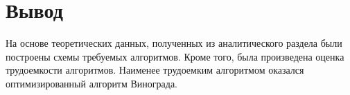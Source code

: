 \section*{Вывод}

На основе теоретических данных, полученных из аналитического раздела
были построены схемы требуемых алгоритмов. Кроме того, была произведена оценка трудоемкости алгоритмов. Наименее трудоемким алгоритмом оказался оптимизированный алгоритм Винограда.
